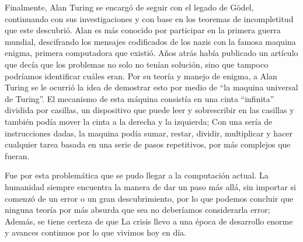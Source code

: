 \documentclass{article}
\begin{document}
Finalmente, Alan Turing se encargó de seguir con el legado de Gödel, continuando con sus investigaciones y con base en los teoremas de incompletitud que este descubrió. Alan es más conocido por participar en la primera guerra mundial, descifrando los mensajes codificados de los nazis con la famosa maquina enigma, primera computadora que existió. Años atrás había publicado un artículo que decía que los problemas no solo no tenían solución, sino que tampoco podríamos identificar cuáles eran. Por su teoría y manejo de enigma, a Alan Turing se le ocurrió la idea de demostrar esto por medio de “la maquina universal de Turing”. El mecanismo de esta máquina consistía en una cinta “infinita” dividida por casillas, un dispositivo que puede leer y sobrescribir en las casillas y también podía mover la cinta a la derecha y la izquierda; Con una sería de instrucciones dadas, la maquina podía sumar, restar, dividir, multiplicar y hacer cualquier tarea basada en una serie de pasos repetitivos, por más complejos que fueran.

Fue por esta problemática que se pudo llegar a la computación actual. La humanidad siempre encuentra la manera de dar un paso más allá, sin importar si comenzó de un error o un gran descubrimiento, por lo que podemos concluir que ninguna teoría por más absurda que sea no deberíamos considerarla error; Además, se tiene certeza de que La crisis llevo a una época de desarrollo enorme y avances continuos por lo que vivimos hoy en día.
\end{document}
